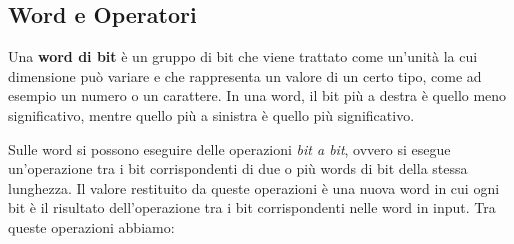 \subsection{Word e Operatori}
\begin{definizione}
    Una \textbf{word di bit} è un gruppo di bit che viene trattato come un'unità
    la cui dimensione può variare e che rappresenta un valore di un certo tipo,
    come ad esempio un numero o un carattere. In una word, il bit più a destra è
    quello meno significativo, mentre quello più a sinistra è quello più significativo.
\end{definizione}
Sulle word si possono eseguire delle operazioni \textit{bit a bit}, ovvero si
esegue un'operazione tra i bit corrispondenti di due o più words di bit della
stessa lunghezza. Il valore restituito da queste operazioni è una nuova word in
cui ogni bit è il risultato dell'operazione tra i bit corrispondenti nelle word
in input. Tra queste operazioni abbiamo:
